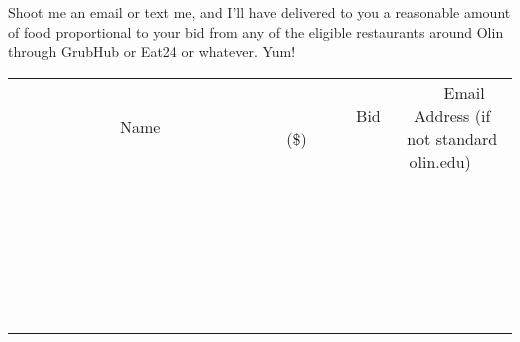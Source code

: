 \documentclass[11pt]{article}
\begin{document}
Shoot me an email or text me, and I'll have delivered to you a reasonable amount of food proportional to your bid from any of the eligible restaurants around Olin through GrubHub or Eat24 or whatever. Yum!
\\[6ex]
\begin{tabular}{c c c}
~~~~~~~~~~~~~Name~~~~~~~~~~~~~ & ~~~~~~~~~Bid (\$)~~~~~~~~~  & ~~~Email Address (if not standard olin.edu)~~~\\
 & & \\
\hline
 & & \\
\hline
 & & \\
\hline
 & & \\
\hline
 & & \\
\hline
 & & \\
\hline
 & & \\
\hline
 & & \\
\hline
 & & \\
\hline
 & & \\
\hline
 & & \\
\hline
 & & \\
\hline
 & & \\
\hline
 & & \\
\hline
 & & \\
\hline
 & & \\
\hline
 & & \\
\hline
 & & \\
\hline
 & & \\
\hline
 & & \\
\hline
 & & \\
\hline
 & & \\
\hline
 & & \\
\hline
 & & \\
\hline
 & & \\
\hline
 & & \\
\hline
\end{tabular}
\newpage
\end{document}

